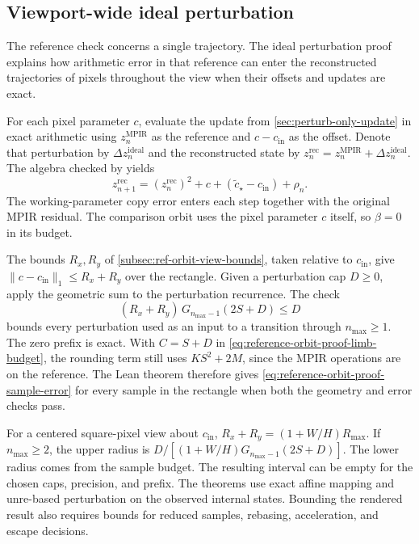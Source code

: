 \subsection{Viewport-wide ideal perturbation}
\label{subsec:reference-orbit-proof-ideal-perturbation}

The reference check concerns a single trajectory. The ideal perturbation
proof explains how arithmetic error in that reference can enter the
reconstructed trajectories of pixels throughout the view when their
offsets and updates are exact.

For each pixel parameter \(c\), evaluate the update from
\cref{sec:perturb-only-update} in exact arithmetic using
\(z_n^{\mathrm{MPIR}}\) as the reference and \(c-c_{\mathrm{in}}\) as
the offset. Denote that perturbation by \(\Delta z_n^{\mathrm{ideal}}\)
and the reconstructed state by
\(z_n^{\mathrm{rec}}=z_n^{\mathrm{MPIR}}+\Delta z_n^{\mathrm{ideal}}\).
The algebra checked by  yields
\begin{equation}
  z_{n+1}^{\mathrm{rec}}=(z_n^{\mathrm{rec}})^2+c+
    (\widetilde c_\star-c_{\mathrm{in}})+\rho_n .
  \label{eq:reference-orbit-proof-reconstructed-residual}
\end{equation}
The working-parameter copy error enters each step together with the
original MPIR residual. The comparison orbit uses the pixel parameter
\(c\) itself, so \(\beta=0\) in its budget.

The bounds \(R_x,R_y\) of \cref{subsec:ref-orbit-view-bounds}, taken relative
to \(c_{\mathrm{in}}\), give
\(\lVert c-c_{\mathrm{in}}\rVert_1\le R_x+R_y\) over the rectangle.
Given a perturbation cap \(D\ge0\), apply the geometric sum to the
perturbation recurrence. The check
\begin{equation}
  (R_x+R_y)\,G_{n_{\max}-1}(2S+D)\le D
  \label{eq:reference-orbit-proof-perturbation-cap}
\end{equation}
bounds every perturbation used as an input to a transition through
\(n_{\max}\ge1\). The zero prefix is exact. With \(C=S+D\) in
\eqref{eq:reference-orbit-proof-limb-budget}, the rounding term still
uses \(KS^2+2M\), since the MPIR operations are on the reference.
The Lean theorem  therefore gives
\eqref{eq:reference-orbit-proof-sample-error} for every sample in the
rectangle when both the geometry and error checks pass.

For a centered square-pixel view about \(c_{\mathrm{in}}\),
\(R_x+R_y=(1+W/H)R_{\max}\). If \(n_{\max}\ge2\), the upper radius is
\(D/[(1+W/H)G_{n_{\max}-1}(2S+D)]\). The lower radius comes from the
sample budget. The resulting interval can be empty for the chosen
caps, precision, and prefix. The theorems use exact affine mapping and
unre-based perturbation on the observed internal states. Bounding the
rendered result also requires bounds for reduced samples, rebasing,
acceleration, and escape decisions.

